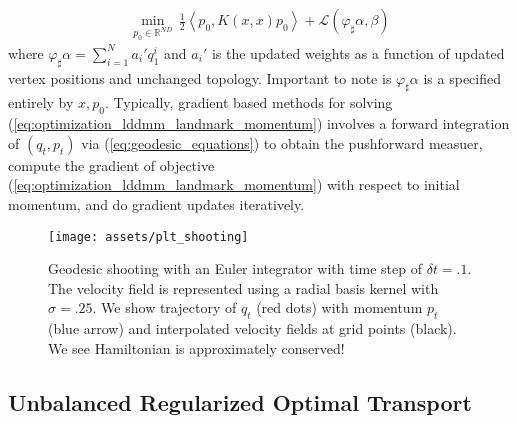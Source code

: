 \documentclass{6838publ}
\newcommand\sL{\ensuremath{\mathcal{L}}}
\newcommand\R{\ensuremath{\mathbb{R}}} %
\newcommand\inner[2]{\ensuremath{\left< #1, #2 \right>}} %
\begin{document}
\begin{align}
    \min_{p_0\in\R^{ND}} \,
        \frac{1}{2} \inner{ p_0 }{ K(x,x) p_0 } + \sL(\varphi_\sharp \alpha, \beta)
    \label{eq:optimization_lddmm_landmark_momentum}
\end{align}
where $\varphi_\sharp\alpha = \sum_{i=1}^N a_i' q_1^i$ and $a_i'$ is the updated weights as a function of updated vertex positions and unchanged topology. Important to note is $\varphi_\sharp\alpha$ is a specified entirely by $x,p_0$. Typically, gradient based methods for solving (\ref{eq:optimization_lddmm_landmark_momentum}) involves a forward integration of $(q_t,p_t)$ via (\ref{eq:geodesic_equations}) to obtain the pushforward measuer, compute the gradient of objective (\ref{eq:optimization_lddmm_landmark_momentum}) with respect to initial momentum, and do gradient updates iteratively.


\begin{center} 
\begin{figure}[t]
    \texttt{[image: assets/plt\_shooting]} 
    \caption{Geodesic shooting with an Euler integrator with time step of $\delta t = .1$. The velocity field is represented using a radial basis kernel with $\sigma=.25$. We show trajectory of $q_t$ (red dots) with momentum $p_t$ (blue arrow) and interpolated velocity fields at grid points (black). We see Hamiltonian is approximately conserved!}
    \label{fig:plt_shooting}
\end{figure} 
\end{center}


\subsection{Unbalanced Regularized Optimal Transport}
\end{document}
